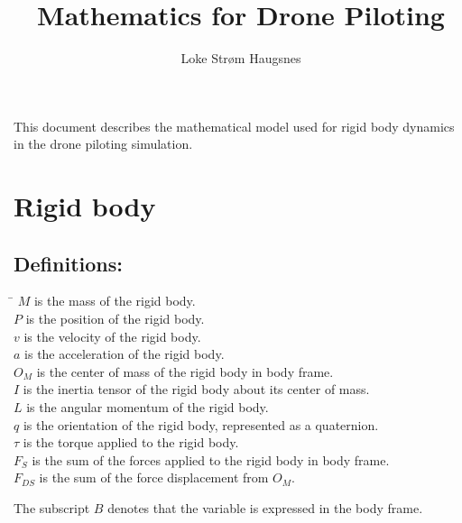 \documentclass{article}
\author{Loke Strøm Haugsnes}
\title{Mathematics for Drone Piloting}
\begin{document}
\maketitle

This document describes the mathematical model used for rigid body dynamics
in the drone piloting simulation.

\section{Rigid body}

\subsection*{Definitions:}

\begin{tabbing}
	\hspace{1cm}\= \kill
	\> \( M \) is the mass of the rigid body. \\
    \> \( P \) is the position of the rigid body. \\
    \> \( v \) is the velocity of the rigid body. \\
    \> \( a \) is the acceleration of the rigid body. \\
	\> \( O_M \) is the center of mass of the rigid body in body frame. \\
	\> \( I \) is the inertia tensor of the rigid body about its center of mass. \\
	\> \( L \) is the angular momentum of the rigid body. \\
    \> \( q \) is the orientation of the rigid body, represented as a quaternion. \\
	\> \( \tau \) is the torque applied to the rigid body. \\
    \> \( F_S \) is the sum of the forces applied to the rigid body in body frame. \\
    \> \( F_{DS} \) is the sum of the force displacement from \( O_M \). \\
\end{tabbing}
The subscript \( B \) denotes that the variable is expressed in the body frame.
\end{document}
